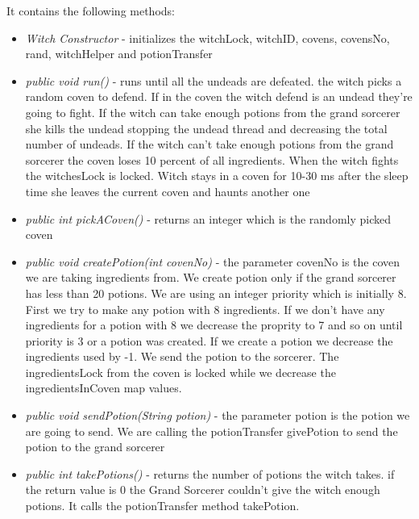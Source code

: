 \documentclass[14pt]{article}
\begin{document}
It contains the following methods:\\
\begin{itemize}
            \item \textit{Witch Constructor} - initializes the witchLock, witchID, covens, covensNo, rand, witchHelper and potionTransfer
            \item \textit{public void run()} - runs until all the undeads are defeated. the witch picks a random coven to defend. If in the coven the witch defend is an undead they're going to fight. If the witch can take enough potions from the grand sorcerer she kills the undead stopping the undead thread and decreasing the total number of undeads. If the witch can't take enough potions from the grand sorcerer the coven loses 10 percent of all ingredients. When the witch fights the witchesLock is locked. Witch stays in a coven for 10-30 ms after the sleep time she leaves the current coven and haunts another one
            \item \textit{public int pickACoven()} - returns an integer which is the randomly picked coven
            \item \textit{public void createPotion(int covenNo)} - the parameter covenNo is the coven we are taking ingredients from. We create potion only if the grand sorcerer has less than 20 potions. We are using an integer priority which is initially 8. First we try to make any potion with 8 ingredients. If we don't have any ingredients for a potion with 8 we decrease the proprity to 7 and so on until priority is 3 or a potion was created. If we create a potion we decrease the ingredients used by -1. We send the potion to the sorcerer. The ingredientsLock from the coven is locked while we decrease the ingredientsInCoven map values.
            \item \textit{public void sendPotion(String potion)} - the parameter potion is the potion we are going to send. We are calling the potionTransfer givePotion to send the potion to the grand sorcerer
            \item \textit{public int takePotions()} - returns the number of potions the witch takes. if the return value is 0 the Grand Sorcerer couldn't give the witch enough potions. It calls the potionTransfer method takePotion.
\end{itemize}
\end{document}
